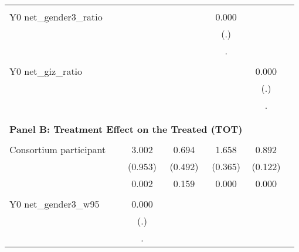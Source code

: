 \begin{table}[!h]
\begin{adjustbox}{width=\columnwidth,center}
\begin{tabular}{l*{5}{c}}
                    &                     &                     &                     &                     \\
Y0 net\_gender3\_ratio&                     &                     &       0.000         &                     \\
                    &                     &                     &         (.)         &                     \\
                    &                     &                     &           .         &                     \\
                    &                     &                     &                     &                     \\
Y0 net\_giz\_ratio    &                     &                     &                     &       0.000         \\
                    &                     &                     &                     &         (.)         \\
                    &                     &                     &                     &           .         \\
                    &                     &                     &                     &                     \\
\hline \\ \multicolumn{4}{c}{\textbf{Panel B: Treatment Effect on the Treated (TOT)}} \\\\[-1ex]
Consortium participant&       3.002\sym{***}&       0.694         &       1.658\sym{***}&       0.892\sym{***}\\
                    &     (0.953)         &     (0.492)         &     (0.365)         &     (0.122)         \\
                    &       0.002         &       0.159         &       0.000         &       0.000         \\
                    &                     &                     &                     &                     \\
Y0 net\_gender3\_w95  &       0.000         &                     &                     &                     \\
                    &         (.)         &                     &                     &                     \\
                    &           .         &                     &                     &                     \\

\end{tabular}
\end{adjustbox}
\end{table}
